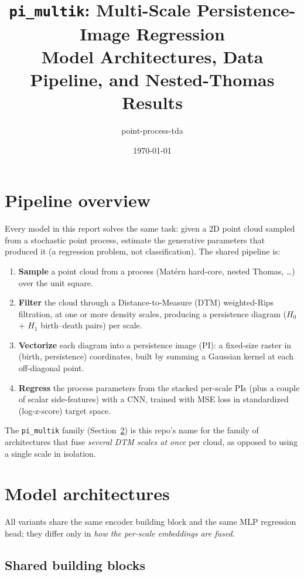 \documentclass[11pt]{article}
\title{\texorpdfstring{\texttt{pi\_multik}}{pi\_multik}: Multi-Scale Persistence-Image Regression\\
\large Model Architectures, Data Pipeline, and Nested-Thomas Results}
\author{point-process-tda}
\date{\today}
\begin{document}
\maketitle
\vspace{-2em}

\tableofcontents

\section{Pipeline overview}

Every model in this report solves the same task: given a 2D point cloud sampled from a
stochastic point process, estimate the generative parameters that produced it (a
regression problem, not classification). The shared pipeline is:

\begin{enumerate}
\item \textbf{Sample} a point cloud from a process (Matérn hard-core, nested Thomas, \ldots)
  over the unit square.
\item \textbf{Filter} the cloud through a Distance-to-Measure (DTM) weighted-Rips
  filtration, at one or more density scales, producing a persistence diagram
  ($H_0$ + $H_1$ birth--death pairs) per scale.
\item \textbf{Vectorize} each diagram into a persistence image (PI): a fixed-size
  raster in (birth, persistence) coordinates, built by summing a Gaussian kernel at
  each off-diagonal point.
\item \textbf{Regress} the process parameters from the stacked per-scale PIs (plus a
  couple of scalar side-features) with a CNN, trained with MSE loss in
  standardized (log-z-score) target space.
\end{enumerate}

The \texttt{pi\_multik} family (Section~\ref{sec:architectures}) is this repo's
name for the family of architectures that fuse \emph{several DTM scales at once}
per cloud, as opposed to using a single scale in isolation.

\section{Model architectures}
\label{sec:architectures}

All variants share the same encoder building block and the same MLP regression
head; they differ only in \emph{how the per-scale embeddings are fused}.

\subsection{Shared building blocks}
\end{document}
